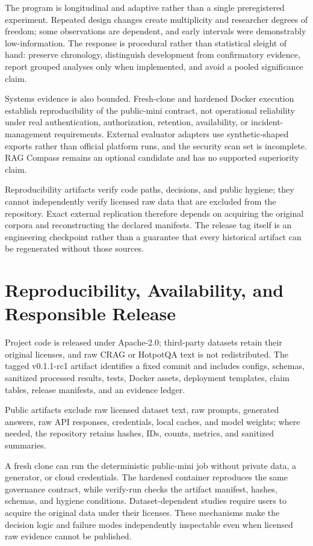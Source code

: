 \documentclass[11pt]{article}
\begin{document}
The program is longitudinal and adaptive rather than a single
preregistered experiment. Repeated design changes create multiplicity
and researcher degrees of freedom; some observations are dependent, and
early intervals were demonstrably low-information. The response is
procedural rather than statistical sleight of hand: preserve chronology,
distinguish development from confirmatory evidence, report grouped
analyses only when implemented, and avoid a pooled significance claim.

Systems evidence is also bounded. Fresh-clone and hardened Docker
execution establish reproducibility of the public-mini contract, not
operational reliability under real authentication, authorization,
retention, availability, or incident-management requirements. External
evaluator adapters use synthetic-shaped exports rather than official
platform runs, and the security scan set is incomplete. RAG Compass
remains an optional candidate and has no supported superiority claim.

Reproducibility artifacts verify code paths, decisions, and public
hygiene; they cannot independently verify licensed raw data that are
excluded from the repository. Exact external replication therefore
depends on acquiring the original corpora and reconstructing the
declared manifests. The release tag itself is an engineering checkpoint
rather than a guarantee that every historical artifact can be
regenerated without those sources.

\section{Reproducibility, Availability, and Responsible Release}\label{sec:reproducibility}

Project code is released under Apache-2.0; third-party datasets retain
their original licenses, and raw CRAG or HotpotQA text is not
redistributed. The tagged v0.1.1-rc1 artifact identifies a fixed commit
and includes configs, schemas, sanitized processed results, tests,
Docker assets, deployment templates, claim tables, release manifests,
and an evidence ledger.

Public artifacts exclude raw licensed dataset text, raw prompts,
generated answers, raw API responses, credentials, local caches, and
model weights; where needed, the repository retains hashes, IDs, counts,
metrics, and sanitized summaries.

A fresh clone can run the deterministic public-mini job without private
data, a generator, or cloud credentials. The hardened container
reproduces the same governance contract, while verify-run checks the
artifact manifest, hashes, schemas, and hygiene conditions.
Dataset-dependent studies require users to acquire the original data
under their licenses. These mechanisms make the decision logic and
failure modes independently inspectable even when licensed raw evidence
cannot be published.
\end{document}
